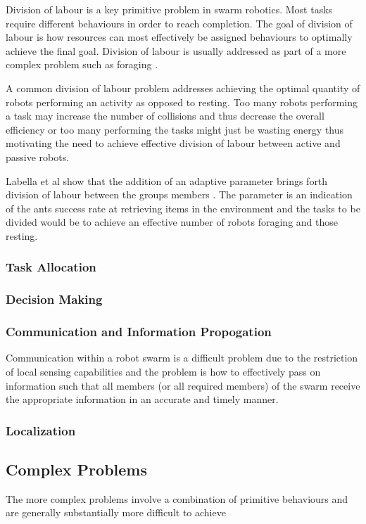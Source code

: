 Division of labour is a key primitive problem  in swarm robotics. Most tasks require different behaviours in order to reach completion. The goal of division of labour is how resources can most effectively be assigned behaviours to optimally achieve the final goal. Division of labour is usually addressed as part of a more complex problem such as foraging \cite{jones2003adaptive}.
 
A common division of labour problem addresses achieving the optimal quantity of robots performing an activity as opposed to resting. Too many robots performing a task may increase the number of collisions and thus decrease the overall efficiency or too many performing the tasks might just be wasting energy thus motivating the need to achieve effective division of labour between active and passive robots.

Labella et al show  that the addition of an adaptive parameter brings forth division of labour between the groups members \cite{labella2006division}. The parameter is an indication of the ants success rate at retrieving items in the environment and the tasks to be divided would be to achieve an effective number of robots foraging and those resting.


\subsubsection{Task Allocation}

\subsubsection{Decision Making}

\subsubsection{Communication and Information Propogation}
Communication within a robot swarm is a difficult problem due to the restriction of local sensing capabilities and the problem is how to effectively pass on information such that all members (or all required members) of the swarm receive the appropriate information in an accurate and timely manner.

\subsubsection{Localization}

\subsection{Complex Problems}
The more complex problems involve a combination of primitive behaviours and are generally substantially more difficult to achieve


